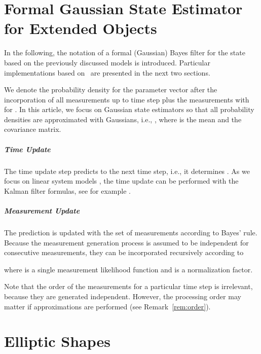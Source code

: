 \documentclass[preprint,1p,11pt]{ISAS_IR}
\begin{document}
\chapter{Formal Gaussian State Estimator  for Extended Objects}\label{sec:bayes_est}
In the following, the notation of a formal (Gaussian) Bayes filter for   the state  based on the previously discussed models is introduced. Particular implementations  based on \rhms\ are presented in the next two sections.

We denote the probability density for the  parameter vector    after the incorporation of  all measurements up to time step  plus the measurements  with          for . In this article, we focus on Gaussian state estimators so that all probability densities are approximated with    Gaussians, i.e.,  , where  is the mean and  the covariance matrix.


 
\paragraph*{Time Update}
The time update  step predicts       to the next time step, i.e.,  it determines  . 
As we focus on linear system models , the time update can be performed with the Kalman filter formulas, see for example \cite{Bar-Shalom2002}.



\paragraph*{Measurement Update}
The prediction  is  updated with the set of measurements      according to Bayes' rule.
Because the measurement generation process is assumed to be independent for consecutive measurements,  they can be incorporated recursively according to

where   is a single measurement likelihood function and  is a normalization factor.
 
Note that the order of the measurements for a particular time step is irrelevant, because they are generated independent.
However, the processing order may matter if approximations are performed (see Remark~\ref{rem:order}). 
 






\chapter{Elliptic Shapes}\label{sec:rhm_ellipse}
\end{document}
